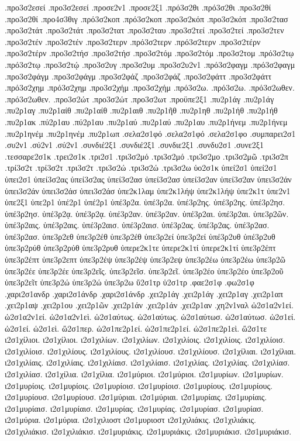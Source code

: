{.προ3σ2εσεί  .προ3σ2εσεί
.προσε2ν1
.προσε2ξ1
.πρό3σ2θι  .πρό3σ2θι
.προ3σ2θί  .προ3σ2θί
.προ4σ3θιγ
.πρό3σ2κοπ  .πρό3σ2κοπ
.προ3σ2κόπ  .προ3σ2κόπ
.προ3σ2τασ
.προ3σ2τάτ  .προ3σ2τάτ
.προ3σ2τατ
.προ3σ2ταυ
.προ3σ2τεί  .προ3σ2τεί
.προ3σ2τεν
.προ3σ2τέν  .προ3σ2τέν
.προ3σ2τερν
.πρό3σ2τερν  .πρό3σ2τερν
.προ3σ2τέρν  .προ3σ2τέρν
.προ3σ2τήσ  .προ3σ2τήσ
.προ3σ2τόμ  .προ3σ2τόμ
.προ3σ2τομ
.πρό3σ2τῳ  .πρό3σ2τῳ
.προ3σ2τῴ
.προ3σ2υγ
.προ3σ2υμ
.προ3σ2υ2ν1
.πρό3σ2φαγμ  .πρό3σ2φαγμ
.προ3σ2φάγμ  .προ3σ2φάγμ
.προ3σ2φάζ  .προ3σ2φάζ
.προ3σ2φάττ  .προ3σ2φάττ
.πρό3σ2χημ  .πρό3σ2χημ
.προ3σ2χήμ  .προ3σ2χήμ
.πρό3σ2ω.  .πρό3σ2ω.
.πρό3σ2ωθεν.  .πρό3σ2ωθεν.
.προ3σ2ώτ  .προ3σ2ώτ
.προ3σ2ωτ
.προϋπε2ξ1
.πυ2ρ1άγ  .πυ2ρ1άγ
.πυ2ρ1αγ
.πυ2ρ1αίθ  .πυ2ρ1αίθ
.πυ2ρ1αιθ
.πυ2ρ1ῆθ
.πυ2ρ1ηθ
.πυ2ρ1ήθ  .πυ2ρ1ήθ
.πυ2ρ1ακ
.πύ2ρ1αυ  .πύ2ρ1αυ
.πυ2ρ1αύ  .πυ2ρ1αύ
.πυ2ρ1αυ
.πυ2ρ1ήνεμ  .πυ2ρ1ήνεμ
.πυ2ρ1ηνέμ  .πυ2ρ1ηνέμ
.πυ2ρ1ωπ
.σελα2σ1φό  .σελα2σ1φό
.σελα2σ1φο
.συμπαρει2σ1
.συ2ν1
.σύ2ν1  .σύ2ν1
.συνδιέ2ξ1  .συνδιέ2ξ1
.συνδιε2ξ1
.συνδυ2σ1
.συνε2ξ1
.τεσσαρε2σ1κ
.τρει2σ1κ
.τρι2σ1
.τρι3σ2μό  .τρι3σ2μό
.τρι3σ2μο
.τρι3σ2μῶ
.τρι3σ2π
.τρί3σ2τ  .τρί3σ2τ
.τρι3σ2τ
.τρι3σ2ώ  .τρι3σ2ώ
.τρι3σ2ω
ὑο2σ1κ
ὑπεί2σ1  ὑπεί2σ1
ὑπει2σ1
ὑπεί3σ2ας  ὑπεί3σ2ας
ὑπεί3σ2ασ  ὑπεί3σ2ασ
ὑπεί3σ2αν  ὑπεί3σ2αν
ὑπει3σ2άν  ὑπει3σ2άν
ὑπει3σ2άσ  ὑπει3σ2άσ
ὑπε2κ1λαμ
ὑπε2κ1λήψ  ὑπε2κ1λήψ
ὑπε2κ1τ
ὑπε2ν1
ὑπε2ξ1
ὑπε2ρ1
ὑπέ2ρ1  ὑπέ2ρ1
ὑπέ3ρ2α.  ὑπέ3ρ2α.
ὑπέ3ρ2ης.  ὑπέ3ρ2ης.
ὑπέ3ρ2ησ.  ὑπέ3ρ2ησ.
ὑπέ3ρ2ᾳ.  ὑπέ3ρ2ᾳ.
ὑπέ3ρ2αν.  ὑπέ3ρ2αν.
ὑπέ3ρ2αι.  ὑπέ3ρ2αι.
ὑπε3ρ2ῶν.
ὑπέ3ρ2αις.  ὑπέ3ρ2αις.
ὑπέ3ρ2αισ.  ὑπέ3ρ2αισ.
ὑπέ3ρ2ας.  ὑπέ3ρ2ας.
ὑπέ3ρ2ασ.  ὑπέ3ρ2ασ.
ὑπε3ρ2εθ
ὑπε3ρ2έθ  ὑπε3ρ2έθ
ὑπε3ρ2εί  ὑπε3ρ2εί
ὑπέ3ρ2υθ  ὑπέ3ρ2υθ
ὑπε3ρ2ρύθ  ὑπε3ρ2ρύθ
ὑπε3ρ2ρυθ
ὑπερε2κ1τε
ὑπερε2κ1τί  ὑπερε2κ1τί
ὑπε3ρ2έπτ  ὑπε3ρ2έπτ
ὑπε3ρ2επτ
ὑπε3ρ2έψ  ὑπε3ρ2έψ
ὑπε3ρ2εψ
ὑπε3ρ2έω  ὑπε3ρ2έω
ὑπε3ρ2ῶ
ὑπε3ρ2έε  ὑπε3ρ2έε
ὑπε3ρ2εῖς.
ὑπε3ρ2εῖσ.
ὑπε3ρ2εῖ.
ὑπε3ρ2έο  ὑπε3ρ2έο
ὑπε3ρ2οῦ
ὑπε3ρ2εῖτ
ὑπε3ρ2ώ  ὑπε3ρ2ώ
ὑπε3ρ2ω
ὕ2σ1τρ
ὑ2σ1τρ
.φαε2σ1φ
.φω2σ1φ
.χαρι2σ1ανδρ
.χαρι2σ1άνδρ  .χαρι2σ1άνδρ
.χει2ρ1άγ  .χει2ρ1άγ
.χει2ρ1αγ
.χει2ρ1απ
.χει2ρ1αψ
.χει2ρ1ου
.χει2ρ1ῶν
.χει2ρ1άν  .χει2ρ1άν
.χει2ρ1αν
.χη2ν1ναλ
ὡ2σ1α2ν1εί.  ὡ2σ1α2ν1εί.
ὡ2σ1α2ν1εὶ.
ὡ2σ1αύτως.  ὡ2σ1αύτως.
ὡ2σ1αύτωσ.  ὡ2σ1αύτωσ.
ὡ2σ1εί.  ὡ2σ1εί.
ὡ2σ1εὶ.
ὥ2σ1περ.
ὡ2σ1πε2ρ1εί.  ὡ2σ1πε2ρ1εί.
ὡ2σ1πε2ρ1εὶ.
ὥ2σ1τε
ι2σ1χίλιοι.  ι2σ1χίλιοι.
ι2σ1χιλίων.  ι2σ1χιλίων.
ι2σ1χιλίοις.  ι2σ1χιλίοις.
ι2σ1χιλίοισ.  ι2σ1χιλίοισ.
ι2σ1χιλίους.  ι2σ1χιλίους.
ι2σ1χιλίουσ.  ι2σ1χιλίουσ.
ι2σ1χίλιαι.  ι2σ1χίλιαι.
ι2σ1χιλίαις.  ι2σ1χιλίαις.
ι2σ1χιλίαισ.  ι2σ1χιλίαισ.
ι2σ1χιλίας.  ι2σ1χιλίας.
ι2σ1χιλίασ.  ι2σ1χιλίασ.
ι2σ1χίλια.  ι2σ1χίλια.
ι2σ1μύριοι.  ι2σ1μύριοι.
ι2σ1μυρίων.  ι2σ1μυρίων.
ι2σ1μυρίοις.  ι2σ1μυρίοις.
ι2σ1μυρίοισ.  ι2σ1μυρίοισ.
ι2σ1μυρίους.  ι2σ1μυρίους.
ι2σ1μυρίουσ.  ι2σ1μυρίουσ.
ι2σ1μύριαι.  ι2σ1μύριαι.
ι2σ1μυρίαις.  ι2σ1μυρίαις.
ι2σ1μυρίαισ.  ι2σ1μυρίαισ.
ι2σ1μυρίας.  ι2σ1μυρίας.
ι2σ1μυρίασ.  ι2σ1μυρίασ.
ι2σ1μύρια.  ι2σ1μύρια.
ι2σ1χιλιοστ
ι2σ1μυριοστ
ι2σ1χιλιάκις.  ι2σ1χιλιάκις.
ι2σ1χιλιάκισ.  ι2σ1χιλιάκισ.
ι2σ1μυριάκις.  ι2σ1μυριάκις.
ι2σ1μυριάκισ.  ι2σ1μυριάκισ.}
\endgroup
\endinput
